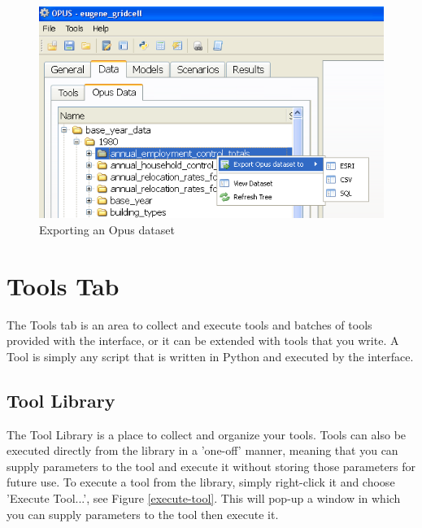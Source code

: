 \begin{figure}[htp]
\begin{center}
\includegraphics[scale=0.8]{part-gui/images/data-manager-opus-data-tab-export-dataset.png}
\end{center}
\caption{Exporting an Opus dataset}
\label{exporting}
\end{figure}

\section{Tools Tab}

The Tools tab is an area to collect and execute tools and batches 
of tools provided with the interface, or it can be extended with tools that you  write.  
A Tool is simply any script that is written in Python and executed by the interface.

\subsection{Tool Library}
The Tool Library is a place to collect and organize your tools.  Tools can also be executed directly from the library in a 'one-off' manner, meaning that you can supply parameters to the tool and execute it without storing those parameters for future use.  To execute a tool from the library, simply right-click it and choose 'Execute Tool...', see Figure \ref{execute-tool}.  This will pop-up a window in which you can supply parameters to the tool then execute it.

